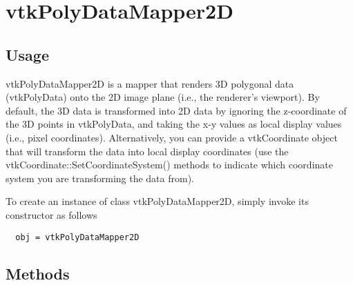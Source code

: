 \section{vtkPolyDataMapper2D}

\subsection{Usage}

 vtkPolyDataMapper2D is a mapper that renders 3D polygonal data 
 (vtkPolyData) onto the 2D image plane (i.e., the renderer's viewport).
 By default, the 3D data is transformed into 2D data by ignoring the 
 z-coordinate of the 3D points in vtkPolyData, and taking the x-y values 
 as local display values (i.e., pixel coordinates). Alternatively, you
 can provide a vtkCoordinate object that will transform the data into
 local display coordinates (use the vtkCoordinate::SetCoordinateSystem()
 methods to indicate which coordinate system you are transforming the
 data from).

To create an instance of class vtkPolyDataMapper2D, simply
invoke its constructor as follows
\begin{verbatim}
  obj = vtkPolyDataMapper2D
\end{verbatim}
\subsection{Methods}

